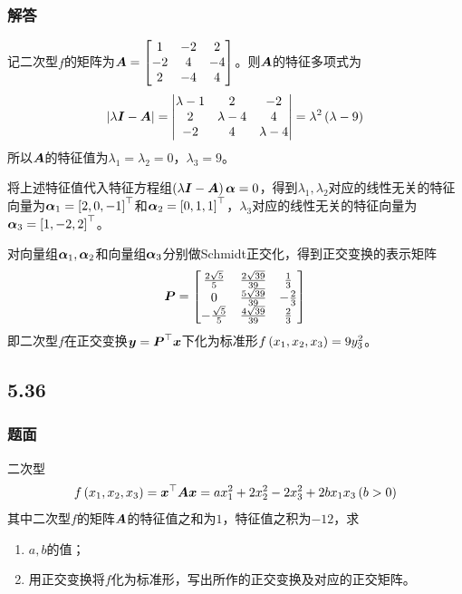 \documentclass{beamer}
\begin{document}
\begin{frame}[allowframebreaks]
    \frametitle{解答}
    记二次型\(f\)的矩阵为\(\boldsymbol{A}=\begin{bmatrix}1&-2&2\\-2&4&-4\\2&-4&4\end{bmatrix}\)。则\(\boldsymbol{A}\)的特征多项式为
    \begin{equation*}
        \left|\lambda\boldsymbol{I}-\boldsymbol{A} \right|=\begin{vmatrix}\lambda-1&2&-2\\2&\lambda-4&4\\-2&4&\lambda-4\end{vmatrix}=\lambda^2\left( \lambda-9 \right)
    \end{equation*}
    所以\(\boldsymbol{A}\)的特征值为\(\lambda_1=\lambda_2=0\)，\(\lambda_3=9\)。

    将上述特征值代入特征方程组\(\left( \lambda\boldsymbol{I}-\boldsymbol{A} \right)\boldsymbol{\alpha}=0\)，得到\(\lambda_1,\lambda_2\)对应的线性无关的特征向量为\(\boldsymbol{\alpha}_1=\left[ 2,0,-1 \right]^\top\)和\(\boldsymbol{\alpha}_2=\left[ 0,1,1 \right]^\top\)，\(\lambda_3\)对应的线性无关的特征向量为\(\boldsymbol{\alpha}_3=\left[ 1,-2,2 \right]^\top\)。

    对向量组\(\boldsymbol{\alpha}_1,\boldsymbol{\alpha}_2\)和向量组\(\boldsymbol{\alpha}_3\)分别做Schmidt正交化，得到正交变换的表示矩阵
    \begin{equation*}
        \boldsymbol{P}=
        \begin{bmatrix}
            \frac{2\sqrt{5}}{5} & \frac{2\sqrt{39}}{39} & \frac{1}{3}  \\
            0                   & \frac{5\sqrt{39}}{39} & -\frac{2}{3} \\
            -\frac{\sqrt{5}}{5} & \frac{4\sqrt{39}}{39} & \frac{2}{3}
        \end{bmatrix}
    \end{equation*}
    即二次型\(f\)在正交变换\(\boldsymbol{y}=\boldsymbol{P}^\top\boldsymbol{x}\)下化为标准形\(f\left( x_1,x_2,x_3 \right)=9y_3^2\)。
\end{frame}

\subsection*{5.36}
\begin{frame}
    \frametitle{题面}
    二次型
    \begin{equation*}
        f\left( x_1,x_2,x_3 \right)=\boldsymbol{x}^\top\boldsymbol{A}\boldsymbol{x}=ax_1^2+2x_2^2-2x_3^2+2bx_1x_3\left( b>0 \right)
    \end{equation*}
    其中二次型\(f\)的矩阵\(\boldsymbol{A}\)的特征值之和为\(1\)，特征值之积为\(-12\)，求
    \begin{enumerate}
        \item \(a,b\)的值；
        \item 用正交变换将\(f\)化为标准形，写出所作的正交变换及对应的正交矩阵。
    \end{enumerate}
\end{frame}
\end{document}
